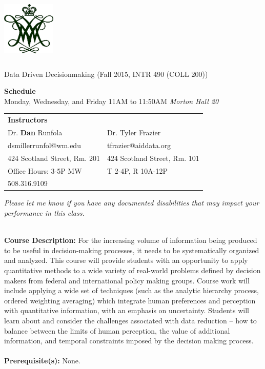 \documentclass[11pt]{article}
\begin{document}
  \begin{center}

{\includegraphics[height=1.25in,width=1in]{wmchiffre1.jpg}} 

\LARGE Data Driven Decisionmaking (Fall 2015, INTR 490 (COLL 200))\\ \vspace{3mm}
\end{center}
\large \textbf{Schedule} \\
\normalsize  Monday, Wednesday, and Friday 11AM to 11:50AM \textit{Morton Hall 20} \\
\vspace{2mm}

\begin{table}[ht]
\begin{tabular}{l l}
\large \textbf{Instructors} & \\
\large Dr. \textbf{Dan} Runfola & Dr. Tyler Frazier \\
\large dsmillerrunfol@wm.edu  & tfrazier@aiddata.org \\
\large 424 Scotland Street, Rm. 201 & 424 Scotland Street, Rm. 101 \\
\large Office Hours: 3-5P MW & T 2-4P, R 10A-12P \\
\large 508.316.9109 &   \\
\end{tabular}
\end{table}


\textit{Please let me know if you have any documented disabilities that may impact your performance in this class.}

\textbf {\large \\ Course Description:} For the increasing volume of information being produced to be useful in decision-making processes, it needs to be systematically organized and analyzed. This course will provide students with an opportunity to apply quantitative methods to a wide variety of real-world problems defined by decision makers from federal and international policy making groups. Course work will include applying a wide set of techniques (such as the analytic hierarchy process, ordered weighting averaging) which integrate human preferences and perception with quantitative information, with an emphasis on uncertainty. Students will learn about and consider the challenges associated with data reduction – how to balance between the limits of human perception, the value of additional information, and temporal constraints imposed by the decision making process.  \\
\\
\textbf {Prerequisite(s):} None.
\end{document}

